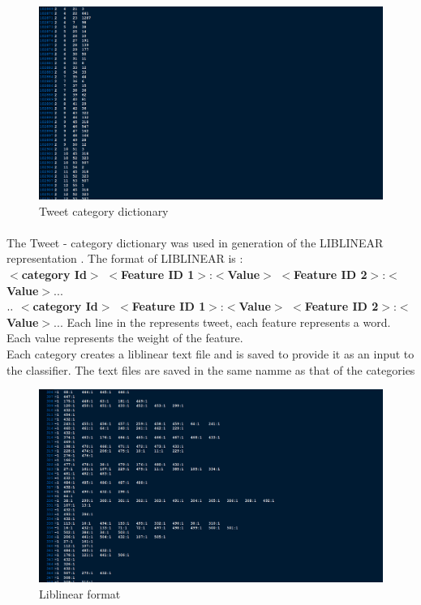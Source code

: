 \begin{figure}[!ht]
	\centering
	\includegraphics[width=0.9\linewidth]{document_file.png}
	\caption{Tweet category dictionary}
	\label{fig:expression01}
\end{figure}


\paragraph{}
The Tweet - category dictionary was used in generation of the LIBLINEAR representation . The format of LIBLINEAR is :\\
\linebreak
$<$\textbf{category Id}$>$ $<$\textbf{Feature ID 1}$>$:$<$\textbf{Value}$>$ $<$\textbf{Feature ID 2}$>$:$<$\textbf{Value}$>$... \\
$
. \\
. \\
$
$<$\textbf{category Id}$>$ $<$\textbf{Feature ID 1}$>$:$<$\textbf{Value}$>$ $<$\textbf{Feature ID 2}$>$:$<$\textbf{Value}$>$...
\linebreak
\linebreak
Each line in the represents tweet, each feature represents a word. Each value represents the weight of the feature. \\
\linebreak
Each category creates a liblinear text file and is saved to provide it as an input to the classifier. The text files are saved in the same namme as that of the categories

\begin{figure}[!ht]
	\centering
	\includegraphics[width=0.9\linewidth]{liblinear.png}
	\caption{Liblinear format}
	\label{fig:expression01}
\end{figure}

